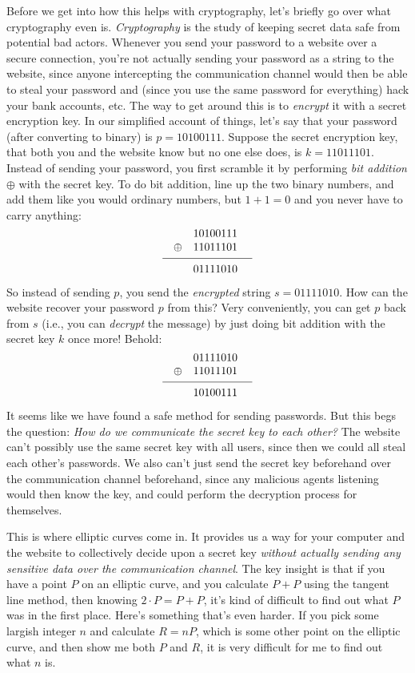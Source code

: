 Before we get into how this helps with cryptography, let's briefly go over what cryptography even is.
{\it Cryptography} is the study of keeping secret data
safe from potential bad actors. Whenever you send your password to a website over a secure connection,
you're not actually sending your password as a string to the website, since anyone intercepting
the communication channel would then be able to steal your password and (since you use the same password
for everything) hack your bank accounts, etc. The way to get around this is to {\it encrypt} it with
a secret encryption key. In our simplified account of things, let's say that your password (after
converting to binary) is $p = 10100111$. Suppose the secret encryption key, that both you and the website know
but no one else does, is $k = 11011101$. Instead of sending your password, you first scramble it by performing
{\it bit addition} $\oplus$ with the secret key. To do bit addition, line up the two binary numbers,
and add them like you would ordinary numbers, but $1+1 =0$ and you never have to carry anything:
$$
\vbox{
\tabskip=1em plus.2em minus .2em
\halign{
\hfil$#$\hfil & \hfil$#$ \cr
& 10100111 \cr
\oplus & 11011101 \cr
\noalign{\medskip}
\noalign{\hrule}
\noalign{\medskip}
& 01111010 \cr
}}
$$
So instead of sending $p$, you send the {\it encrypted}
string $s = 01111010$. How can the website recover your password
$p$ from this? Very conveniently, you can get $p$ back from $s$ (i.e., you can {\it decrypt} the
message) by just doing bit addition with the secret key
$k$ once more! Behold:
$$
\vbox{
\tabskip=1em plus.2em minus .2em
\halign{
\hfil$#$\hfil & \hfil$#$ \cr
& 01111010 \cr
\oplus & 11011101 \cr
\noalign{\medskip}
\noalign{\hrule}
\noalign{\medskip}
& 10100111 \cr
}}
$$
It seems like we have found a safe method for sending passwords. But this begs the question: {\sl How do we
communicate the secret key to each other?} The website can't possibly use the same secret key with all
users, since then we could all steal each other's passwords. We also can't just send the secret key
beforehand over the communication channel beforehand, since any malicious agents listening would then
know the key, and could perform the decryption process for themselves.

This is where elliptic curves come in. It provides us a way for your computer and the website to collectively
decide upon a secret key {\sl without actually sending any sensitive data over the communication channel}.
The key insight is that if you have a point $P$ on an elliptic curve, and you calculate $P+P$ using
the tangent line method, then knowing $2\cdot P = P+P$, it's kind of difficult to find out what $P$ was in the
first place. Here's something that's even harder. If you pick some largish integer $n$ and calculate
$R = nP$, which is some other point on the elliptic curve, and then show me both $P$ and $R$,
it is very difficult for me to find out what $n$ is.

